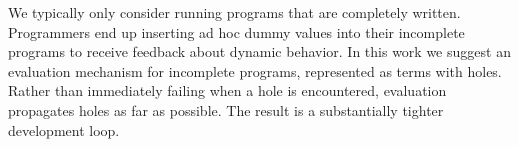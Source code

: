 We typically only consider running programs that are completely
written. Programmers end up inserting ad hoc dummy values into their
incomplete programs to receive feedback about dynamic behavior. In this
work we suggest an evaluation mechanism for incomplete programs,
represented as terms with holes. Rather than immediately failing when a
hole is encountered, evaluation propagates holes as far as possible. The
result is a substantially tighter development loop.
